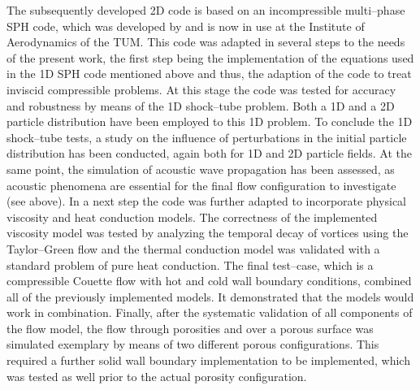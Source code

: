 \documentclass[11pt,a4paper,twoside]{report}
\begin{document}
The subsequently developed 2D code is based on an incompressible multi--phase SPH code, which was developed by \cite{Hu2006} and is now in use at the Institute of Aerodynamics of the TUM. This code was adapted in several steps to the needs of the present work, the first step being the implementation of the equations used in the 1D SPH code mentioned above and thus, the adaption of the code to treat inviscid compressible problems. At this stage the code was tested for accuracy and robustness by means of the 1D shock--tube problem. Both a 1D and a 2D particle distribution have been employed to this 1D problem. To conclude the 1D shock--tube tests, a study on the influence of perturbations in the initial particle distribution has been conducted, again both for 1D and 2D particle fields.
At the same point, the simulation of acoustic wave propagation has been assessed, as acoustic phenomena are essential for the final flow configuration to investigate (see above).
In a next step the code was further adapted to incorporate physical viscosity and heat conduction models. The correctness of the implemented viscosity model was tested by analyzing the temporal decay of vortices using the Taylor--Green flow and the thermal conduction model was validated with a standard problem of pure heat conduction.
The final test--case, which is a compressible Couette flow with hot and cold wall boundary conditions, combined all of the previously implemented models. It demonstrated that the models would work in combination.
Finally, after the systematic validation of all components of the flow model, the flow through porosities and over a porous surface was simulated exemplary by means of two different porous configurations. This required a further solid wall boundary implementation to be implemented, which was tested as well prior to the actual porosity configuration.
\end{document}
